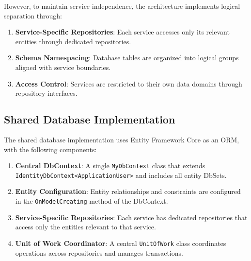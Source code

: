 However, to maintain service independence, the architecture implements logical separation through:

\begin{enumerate}
   \item \textbf{Service-Specific Repositories}: Each service accesses only its relevant entities through dedicated repositories.

   \item \textbf{Schema Namespacing}: Database tables are organized into logical groups aligned with service boundaries.

   \item \textbf{Access Control}: Services are restricted to their own data domains through repository interfaces.
\end{enumerate}

\subsection{Shared Database Implementation}

The shared database implementation uses Entity Framework Core as an ORM, with the following components:

\begin{enumerate}
   \item \textbf{Central DbContext}: A single \texttt{MyDbContext} class that extends \texttt{IdentityDbContext<ApplicationUser>} and includes all entity DbSets.

   \item \textbf{Entity Configuration}: Entity relationships and constraints are configured in the \texttt{OnModelCreating} method of the DbContext.

   \item \textbf{Service-Specific Repositories}: Each service has dedicated repositories that access only the entities relevant to that service.

   \item \textbf{Unit of Work Coordinator}: A central \texttt{UnitOfWork} class coordinates operations across repositories and manages transactions.
\end{enumerate}

